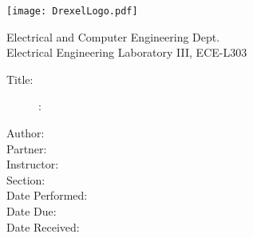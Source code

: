 \begin{titlepage}
	\begin{center}
		\texttt{[image: DrexelLogo.pdf]}
	\end{center}

	\large
	\begin{framed}
		\begin{center}
			Electrical and Computer Engineering Dept. \\
			Electrical Engineering Laboratory III, ECE-L303 \\
		\end{center}
	\end{framed} \vspace{50pt}

	\begin{description}
		\item[Title:]\labNum: \docTitle
		\item[Author:] \docAuthor
		\item[Partner:] \docCoAuthor
		\item[Instructor:] \ta
		\item[Section:] \labSec
		\item[Date Performed:] \perfDate
		\item[Date Due:] \dueDate
		\item[Date Received:]
	\end{description}
\end{titlepage}
